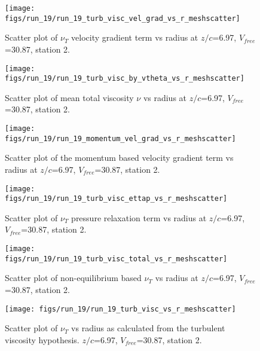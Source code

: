 \begin{figure}[H]
\centering
\texttt{[image: figs/run\_19/run\_19\_turb\_visc\_vel\_grad\_vs\_r\_meshscatter]}
\caption{Scatter plot of $\nu_T$ velocity gradient term vs radius at $z/c$=6.97, $V_{free}$=30.87, station 2.}
\end{figure}


\begin{figure}[H]
\centering
\texttt{[image: figs/run\_19/run\_19\_turb\_visc\_by\_vtheta\_vs\_r\_meshscatter]}
\caption{Scatter plot of mean total viscosity $\nu$ vs radius at $z/c$=6.97, $V_{free}$=30.87, station 2.}
\end{figure}


\begin{figure}[H]
\centering
\texttt{[image: figs/run\_19/run\_19\_momentum\_vel\_grad\_vs\_r\_meshscatter]}
\caption{Scatter plot of the momentum based velocity gradient term vs radius at $z/c$=6.97, $V_{free}$=30.87, station 2.}
\end{figure}


\begin{figure}[H]
\centering
\texttt{[image: figs/run\_19/run\_19\_turb\_visc\_ettap\_vs\_r\_meshscatter]}
\caption{Scatter plot of $\nu_T$ pressure relaxation term vs radius at $z/c$=6.97, $V_{free}$=30.87, station 2.}
\end{figure}


\begin{figure}[H]
\centering
\texttt{[image: figs/run\_19/run\_19\_turb\_visc\_total\_vs\_r\_meshscatter]}
\caption{Scatter plot of non-equilibrium based $\nu_T$ vs radius at $z/c$=6.97, $V_{free}$=30.87, station 2.}
\end{figure}


\begin{figure}[H]
\centering
\texttt{[image: figs/run\_19/run\_19\_turb\_visc\_vs\_r\_meshscatter]}
\caption{Scatter plot of $\nu_T$ vs radius as calculated from the turbulent viscosity hypothesis. $z/c$=6.97, $V_{free}$=30.87, station 2.}
\end{figure}



